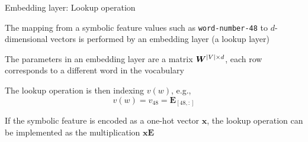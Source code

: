 \documentclass[12pt,aspectratio=169,handout]{beamer}
\begin{document}
\begin{frame}{Embedding layer: Lookup operation}
	
	The mapping from a symbolic feature values such as \texttt{word-number-48} to $d$-dimensional vectors is performed by an embedding layer (a lookup layer)
	
	The parameters in an embedding layer are a matrix $\bm{W}^{\abs{V} \times d}$, each row corresponds to a different word in the vocabulary
	
	The lookup operation is then indexing $v(w)$, e.g.,
	$$v(w) = v_{48} = \bm{E}_{[48,:]}$$
	
	If the symbolic feature is encoded as a one-hot vector $\bm{x}$, the lookup operation can be implemented as the multiplication $\bm{x} \bm{E}$
	
\end{frame}
\end{document}
